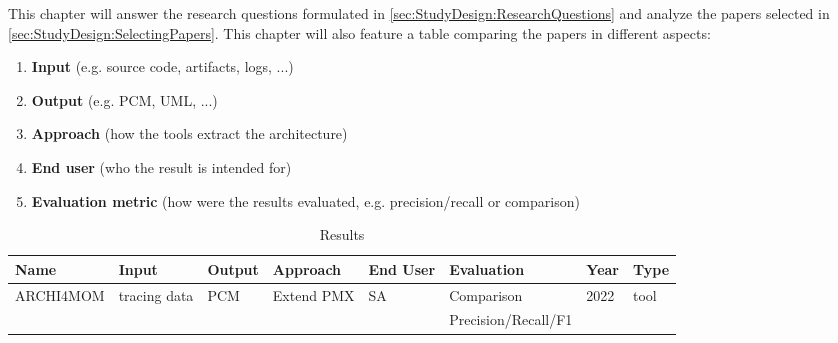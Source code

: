 This chapter will answer the research questions formulated in \ref{sec:StudyDesign:ResearchQuestions} and analyze the papers selected in \ref{sec:StudyDesign:SelectingPapers}.
This chapter will also feature a table comparing the papers in different aspects:
\begin{enumerate}
	\item \textbf{Input} (e.g. source code, artifacts, logs, ...)
	\item \textbf{Output} (e.g. PCM, UML, ...)
	\item \textbf{Approach} (how the tools extract the architecture)
	\item \textbf{End user} (who the result is intended for)
	\item \textbf{Evaluation metric} (how were the results evaluated, e.g. precision/recall or comparison)
\end{enumerate}

\begin{table}
\centering
\begin{tabular}{l l l l l l l l}
\toprule
\textbf{Name} & Input & Output & Approach & End User & Evaluation & Year & Type \\
\midrule
ARCHI4MOM & tracing data & PCM & Extend PMX & SA & Comparison & 2022 & tool \\
		  & 			 & 	   &				&    & Precision/Recall/F1 & & \\
\bottomrule
\end{tabular}
\caption{Results} %
\label{table:results}
\end{table}
